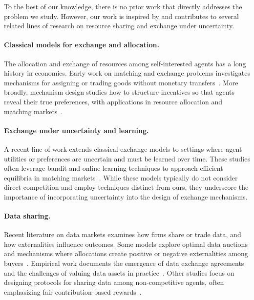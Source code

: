 To the best of our knowledge, there is no prior work that directly addresses the problem we study. 
However, our work is inspired by and contributes to several related lines of research on resource sharing and 
exchange under uncertainty.

\paragraph{Classical models for exchange and allocation.} 
The allocation and exchange of resources among self-interested agents has a long history in economics. 
Early work on matching and exchange problems investigates mechanisms for assigning or trading goods without monetary transfers~\citep{varian1973equity,walras1900elements,fisher1891mathematical}. 
More broadly, mechanism design studies how to structure incentives so that agents reveal their true preferences, 
with applications in resource allocation and matching markets~\citep{gale1962college,shapley1974cores,abdulkadiroglu1999house}.

\paragraph{Exchange under uncertainty and learning.} 
A recent line of work extends classical exchange models to settings where agent utilities or preferences 
are uncertain and must be learned over time. These studies often leverage bandit and online learning techniques 
to approach efficient equilibria in matching markets~\citep{guo2021learning,jagadeesan2021learning,liu2020competing}. 
While these models typically do not consider direct competition and employ techniques distinct from ours, 
they underscore the importance of incorporating uncertainty into the design of exchange mechanisms.


\paragraph{Data sharing.} 
Recent literature on data markets examines how firms share or trade data, 
and how externalities influence outcomes. Some models explore optimal data auctions and mechanisms 
where allocations create positive or negative externalities among buyers~\citep{agarwal2024towards,gu2022data,bonatti2024selling}. 
Empirical work documents the emergence of data exchange agreements and the challenges of valuing data assets in practice~\citep{elsaify2021data}. 
Other studies focus on designing protocols for sharing data among non-competitive agents, often emphasizing 
fair contribution-based rewards~\citep{clintoncollaborative,sim2020collaborative,karimireddy2022mechanisms}.

